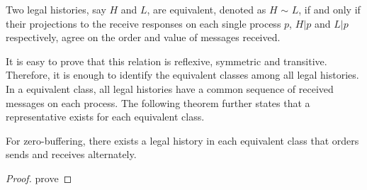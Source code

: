 \begin{definition}\label{def:er}
Two legal histories, say $H$ and $L$, are equivalent, denoted as $H$ $\sim$ $L$, if and only if their projections to the receive responses on each single process $p$, $H | p$ and $L | p$ respectively, agree on the order and value of messages received.
\end{definition}

It is easy to prove that this relation is reflexive, symmetric and transitive. Therefore, it is enough to identify the equivalent classes among all legal histories. In a equivalent class, all legal histories have a common sequence of received messages on each process. The following theorem further states that a representative exists for each equivalent class. 

\begin{theorem}
For zero-buffering, there exists a legal history in each equivalent class that orders sends and receives alternately.
\end{theorem}

\begin{proof}
prove 
\end{proof}



 


